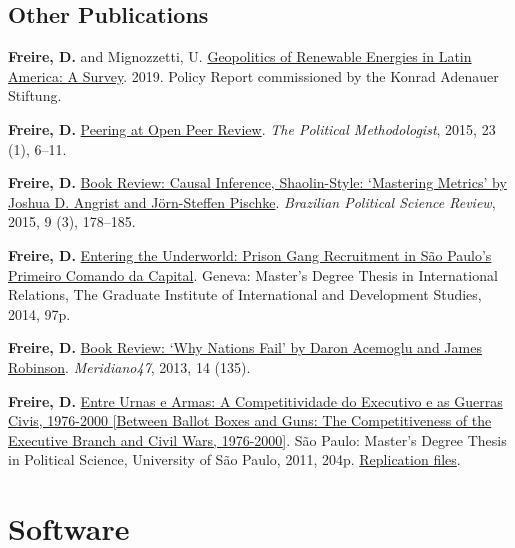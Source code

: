 \documentclass[a4paper]{article}
\renewenvironment{itemize}{
	\begin{list}{}{
			\setlength{\leftmargin}{1.5em}
		}
		}{
	\end{list}
}
\begin{document}
\subsection*{Other Publications}

\begin{itemize}
\item \textbf{Freire, D.} and Mignozzetti, U.  \href{https://www.kas.de/documents/273477/273526/Geopolitics+of+Renewable+Energy+in+Latin+America+-+A+Survey.pdf/9fe39ef1-6028-0836-90b0-aada31cb6769?version=1.0&t=1551887777018}{Geopolitics of Renewable Energies in Latin America: A Survey}. 2019. Policy Report commissioned by the Konrad Adenauer Stiftung.
\item \textbf{Freire, D.} \href{https://thepoliticalmethodologist.files.wordpress.com/2016/02/tpm_v23_n1.pdf}{Peering at Open Peer Review}. \textit{The Political Methodologist}, 2015, 23 (1), 6--11.
\item \textbf{Freire, D.} \href{http://www.scielo.br/readcube/epdf.php?doi=10.1590/1981-38212015000300026&pid=S1981-38212015000300178&pdf_path=bpsr/v9n3/1981-3821-bpsr-9-3-0178.pdf&lang=en}{Book Review: Causal Inference, Shaolin-Style: `Mastering Metrics' by Joshua D. Angrist and J\"{o}rn-Steffen Pischke}. \textit{Brazilian Political Science Review}, 2015, 9 (3), 178--185.
\item \textbf{Freire, D.} \href{http://dx.doi.org/10.6084/m9.figshare.1209203}{Entering the Underworld: Prison Gang Recruitment in S\~{a}o Paulo's Primeiro Comando da Capital}. Geneva: Master's Degree Thesis in International Relations, The Graduate Institute of International and Development Studies, 2014, 97p.
\item \textbf{Freire, D.} \href{http://seer.bce.unb.br/index.php/MED/article/view/7505/6497}{Book Review: `Why Nations Fail' by Daron Acemoglu and James Robinson}. \textit{Meridiano47}, 2013, 14 (135).
\item \textbf{Freire, D.} \href{http://dx.doi.org/10.6084/m9.figshare.963082}{Entre Urnas e Armas: A Competitividade do Executivo e as Guerras Civis, 1976-2000 {[}Between Ballot Boxes and Guns: The Competitiveness of the Executive Branch and Civil Wars, 1976-2000{]}}. S\~{a}o Paulo: Master's Degree Thesis in Political Science, University of S\~{a}o Paulo, 2011, 204p. \href{http://dx.doi.org/10.6084/m9.figshare.963183}{Replication files}.
\end{itemize}

\section*{Software}
\end{document}
